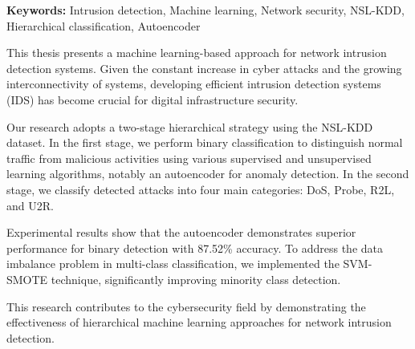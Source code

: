 \documentclass[12pt,a4paper]{report}
\begin{document}
\textbf{Keywords:} Intrusion detection, Machine learning, Network security, NSL-KDD, Hierarchical classification, Autoencoder

This thesis presents a machine learning-based approach for network intrusion detection systems. Given the constant increase in cyber attacks and the growing interconnectivity of systems, developing efficient intrusion detection systems (IDS) has become crucial for digital infrastructure security.

Our research adopts a two-stage hierarchical strategy using the NSL-KDD dataset. In the first stage, we perform binary classification to distinguish normal traffic from malicious activities using various supervised and unsupervised learning algorithms, notably an autoencoder for anomaly detection. In the second stage, we classify detected attacks into four main categories: DoS, Probe, R2L, and U2R.

Experimental results show that the autoencoder demonstrates superior performance for binary detection with 87.52\% accuracy. To address the data imbalance problem in multi-class classification, we implemented the SVM-SMOTE technique, significantly improving minority class detection.

This research contributes to the cybersecurity field by demonstrating the effectiveness of hierarchical machine learning approaches for network intrusion detection.






\end{document}
